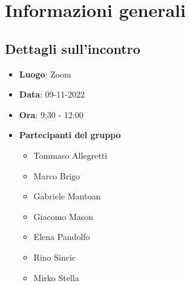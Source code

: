 \section{Informazioni generali}

\subsection{Dettagli sull'incontro}
\begin{itemize}
    \item \textbf{Luogo}: Zoom
    \item \textbf{Data}: 09-11-2022
    \item \textbf{Ora}: 9:30 - 12:00
    \item \textbf{Partecipanti del gruppo}
        \begin{itemize}
            \item Tommaso Allegretti
            \item Marco Brigo
            \item Gabriele Mantoan
            \item Giacomo Mason
            \item Elena Pandolfo
            \item Rino Sincic
            \item Mirko Stella
        \end{itemize}
\end{itemize}